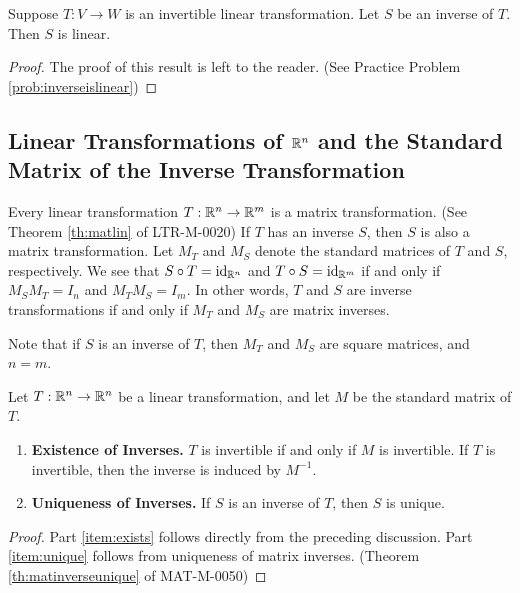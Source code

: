 \documentclass{ximera}
\begin{document}
\begin{theorem}\label{th:inverseislinear} Suppose $T:V\rightarrow W$ is an invertible linear transformation.  Let $S$ be an inverse of $T$.  Then $S$ is  linear.
\end{theorem}

\begin{proof} The proof of this result is left to the reader. (See Practice Problem \ref{prob:inverseislinear})
\end{proof}


\subsection*{Linear Transformations of $\mathbb{R}^n$ and the Standard Matrix of the Inverse Transformation}

Every linear transformation $T:\mathbb{R}^n\rightarrow\mathbb{R}^m$ is a matrix transformation. (See Theorem \ref{th:matlin} of LTR-M-0020)  If $T$ has an inverse $S$, then $S$ is also a matrix transformation.  Let  $M_T$ and $M_S$ denote the standard matrices of $T$ and $S$, respectively.  We see that $S\circ T=\text{id}_{\mathbb{R}^n}$ and $T\circ S=\text{id}_{\mathbb{R}^m}$ if and only if $M_SM_T=I_{n}$ and $M_TM_S=I_{m}$.  In other words, $T$ and $S$ are inverse transformations if and only if $M_T$ and $M_S$ are matrix inverses.

Note that if $S$ is an inverse of $T$, then $M_T$ and $M_S$ are square matrices, and $n=m$. 

\begin{theorem}\label{th:existunique} Let $T:\mathbb{R}^n\rightarrow \mathbb{R}^n$ be a linear transformation, and let $M$ be the standard matrix of $T$.
  \begin{enumerate}
  \item \label{item:exists} {\bf Existence of Inverses.}  $T$ is invertible if and only if $M$ is invertible.  If $T$ is invertible, then the inverse is induced by $M^{-1}$.
  \item \label{item:unique}{\bf Uniqueness of Inverses.}  If $S$ is an inverse of $T$, then $S$ is unique.
  \end{enumerate}
\end{theorem}
\begin{proof}
Part \ref{item:exists} follows directly from the preceding discussion.  Part \ref{item:unique} follows from uniqueness of matrix inverses. (Theorem \ref{th:matinverseunique} of MAT-M-0050)
\end{proof}
\end{document}
